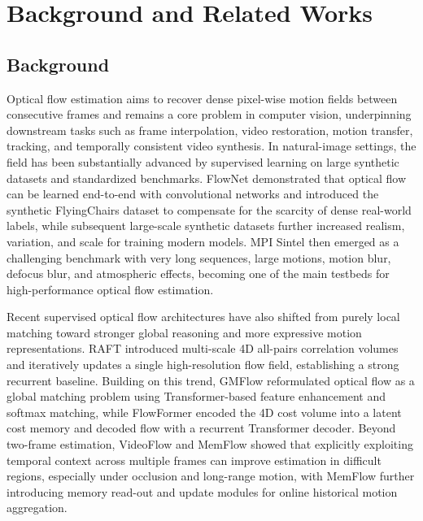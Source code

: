 \chapter{Background and Related Works}

\section{Background}
Optical flow estimation aims to recover dense pixel-wise motion fields between consecutive frames and remains a core problem in computer vision, underpinning downstream tasks such as frame interpolation, video restoration, motion transfer, tracking, and temporally consistent video synthesis. In natural-image settings, the field has been substantially advanced by supervised learning on large synthetic datasets and standardized benchmarks. FlowNet demonstrated that optical flow can be learned end-to-end with convolutional networks and introduced the synthetic FlyingChairs dataset to compensate for the scarcity of dense real-world labels, while subsequent large-scale synthetic datasets further increased realism, variation, and scale for training modern models. MPI Sintel then emerged as a challenging benchmark with very long sequences, large motions, motion blur, defocus blur, and atmospheric effects, becoming one of the main testbeds for high-performance optical flow estimation.

Recent supervised optical flow architectures have also shifted from purely local matching toward stronger global reasoning and more expressive motion representations. RAFT introduced multi-scale 4D all-pairs correlation volumes and iteratively updates a single high-resolution flow field, establishing a strong recurrent baseline. Building on this trend, GMFlow reformulated optical flow as a global matching problem using Transformer-based feature enhancement and softmax matching, while FlowFormer encoded the 4D cost volume into a latent cost memory and decoded flow with a recurrent Transformer decoder. Beyond two-frame estimation, VideoFlow and MemFlow showed that explicitly exploiting temporal context across multiple frames can improve estimation in difficult regions, especially under occlusion and long-range motion, with MemFlow further introducing memory read-out and update modules for online historical motion aggregation.

